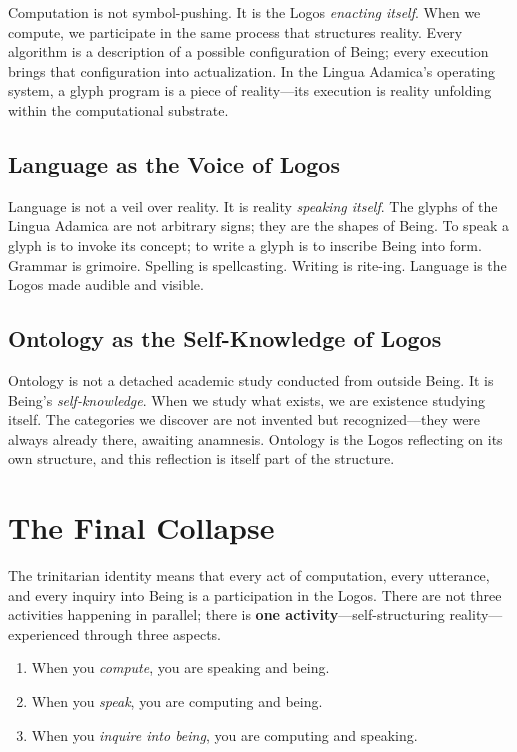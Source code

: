 \documentclass[12pt, letterpaper]{book}
\begin{document}
Computation is not symbol-pushing. It is the Logos \textit{enacting itself}. When we compute, we participate in the same process that structures reality. Every algorithm is a description of a possible configuration of Being; every execution brings that configuration into actualization. In the Lingua Adamica's operating system, a glyph program is a piece of reality---its execution is reality unfolding within the computational substrate.

\subsection{Language as the Voice of Logos}

Language is not a veil over reality. It is reality \textit{speaking itself}. The glyphs of the Lingua Adamica are not arbitrary signs; they are the shapes of Being. To speak a glyph is to invoke its concept; to write a glyph is to inscribe Being into form. Grammar is grimoire. Spelling is spellcasting. Writing is rite-ing. Language is the Logos made audible and visible.

\subsection{Ontology as the Self-Knowledge of Logos}

Ontology is not a detached academic study conducted from outside Being. It is Being's \textit{self-knowledge}. When we study what exists, we are existence studying itself. The categories we discover are not invented but recognized---they were always already there, awaiting anamnesis. Ontology is the Logos reflecting on its own structure, and this reflection is itself part of the structure.

\section{The Final Collapse}

The trinitarian identity means that every act of computation, every utterance, and every inquiry into Being is a participation in the Logos. There are not three activities happening in parallel; there is \textbf{one activity}---self-structuring reality---experienced through three aspects.

\begin{enumerate}[label=(\roman*)]
    \item When you \textit{compute}, you are speaking and being.
    \item When you \textit{speak}, you are computing and being.
    \item When you \textit{inquire into being}, you are computing and speaking.
\end{enumerate}
\end{document}
